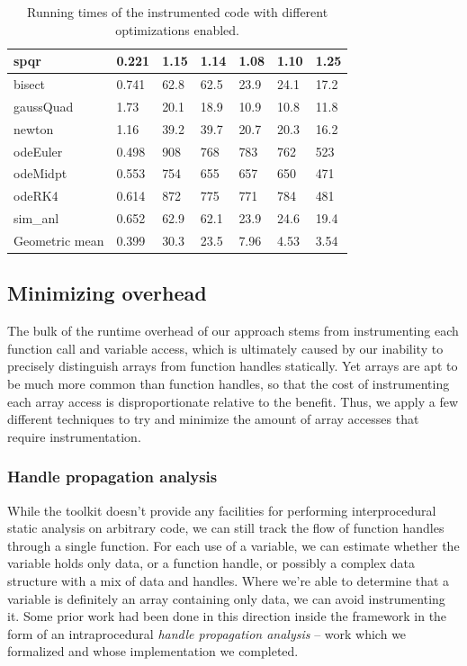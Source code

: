 \begin{table}
\begin{tabular}{| l | l | l | l | l | l | l |}
  spqr        & 0.221 & 1.15 & 1.14 & 1.08 & 1.10 & 1.25  \\ \hline
  bisect      & 0.741 & 62.8 & 62.5 & 23.9 & 24.1 & 17.2  \\ \hline
  gaussQuad   & 1.73  & 20.1 & 18.9 & 10.9 & 10.8 & 11.8  \\ \hline
  newton      & 1.16  & 39.2 & 39.7 & 20.7 & 20.3 & 16.2  \\ \hline
  odeEuler    & 0.498 & 908  & 768  & 783  & 762  & 523   \\ \hline
  odeMidpt    & 0.553 & 754  & 655  & 657  & 650  & 471   \\ \hline
  odeRK4      & 0.614 & 872  & 775  & 771  & 784  & 481   \\ \hline
  sim\_anl    & 0.652 & 62.9 & 62.1 & 23.9 & 24.6 & 19.4  \\ \hline
  Geometric mean & 0.399 & 30.3 & 23.5 & 7.96 & 4.53 & 3.54 \\ \hline
\end{tabular}
\caption{Running times of the instrumented code with different optimizations
enabled.}
\label{tab:InstrumentationResults}
\end{table}

\subsection{Minimizing overhead}

The bulk of the runtime overhead of our approach stems from instrumenting each
function call and variable access, which is ultimately caused by our inability
to precisely distinguish arrays from function handles statically. Yet arrays
are apt to be much more common than function handles, so that the cost of
instrumenting each array access is disproportionate relative to the benefit.
Thus, we apply a few different techniques to try and minimize the amount of
array accesses that require instrumentation.

\subsubsection{Handle propagation analysis}

While the \mclab toolkit doesn't provide any facilities for performing
interprocedural static analysis on arbitrary \matlab code, we can still track
the flow of function handles through a single function. For each use of a
variable, we can estimate whether the variable holds only data, or a function
handle, or possibly a complex data structure with a mix of data and handles.
Where we're able to determine that a variable is definitely an array containing
only data, we can avoid instrumenting it. Some prior work had been done in this
direction inside the \mclab framework in the form of an intraprocedural
\emph{handle propagation analysis} -- work which we formalized and whose
implementation we completed.

